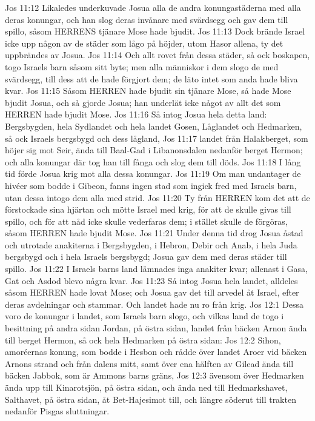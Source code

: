 Jos 11:12  Likaledes underkuvade Josua alla de andra konungastäderna med alla deras konungar, och han slog deras invånare med svärdsegg och gav dem till spillo, såsom HERRENS tjänare Mose hade bjudit.
Jos 11:13  Dock brände Israel icke upp någon av de städer som lågo på höjder, utom Hasor allena, ty det uppbrändes av Josua.
Jos 11:14  Och allt rovet från dessa städer, så ock boskapen, togo Israels barn såsom sitt byte; men alla människor i dem slogo de med svärdsegg, till dess att de hade förgjort dem; de läto intet som anda hade bliva kvar.
Jos 11:15  Såsom HERREN hade bjudit sin tjänare Mose, så hade Mose bjudit Josua, och så gjorde Josua; han underlät icke något av allt det som HERREN hade bjudit Mose.
Jos 11:16  Så intog Josua hela detta land: Bergsbygden, hela Sydlandet och hela landet Gosen, Låglandet och Hedmarken, så ock Israels bergsbygd och dess lågland,
Jos 11:17  landet från Halakberget, som höjer sig mot Seir, ända till Baal-Gad i Libanonsdalen nedanför berget Hermon; och alla konungar där tog han till fånga och slog dem till döds.
Jos 11:18  I lång tid förde Josua krig mot alla dessa konungar.
Jos 11:19  Om man undantager de hivéer som bodde i Gibeon, fanns ingen stad som ingick fred med Israels barn, utan dessa intogo dem alla med strid.
Jos 11:20  Ty från HERREN kom det att de förstockade sina hjärtan och mötte Israel med krig, för att de skulle givas till spillo, och för att nåd icke skulle vederfaras dem; i stället skulle de förgöras, såsom HERREN hade bjudit Mose.
Jos 11:21  Under denna tid drog Josua åstad och utrotade anakiterna i Bergsbygden, i Hebron, Debir och Anab, i hela Juda bergsbygd och i hela Israels bergsbygd; Josua gav dem med deras städer till spillo.
Jos 11:22  I Israels barns land lämnades inga anakiter kvar; allenast i Gasa, Gat och Asdod blevo några kvar.
Jos 11:23  Så intog Josua hela landet, alldeles såsom HERREN hade lovat Mose; och Josua gav det till arvedel åt Israel, efter deras avdelningar och stammar. Och landet hade nu ro från krig.
Jos 12:1  Dessa voro de konungar i landet, som Israels barn slogo, och vilkas land de togo i besittning på andra sidan Jordan, på östra sidan, landet från bäcken Arnon ända till berget Hermon, så ock hela Hedmarken på östra sidan:
Jos 12:2  Sihon, amoréernas konung, som bodde i Hesbon och rådde över landet Aroer vid bäcken Arnons strand och från dalens mitt, samt över ena hälften av Gilead ända till bäcken Jabbok, som är Ammons barns gräns,
Jos 12:3  ävensom över Hedmarken ända upp till Kinarotsjön, på östra sidan, och ända ned till Hedmarkshavet, Salthavet, på östra sidan, åt Bet-Hajesimot till, och längre söderut till trakten nedanför Pisgas sluttningar.
